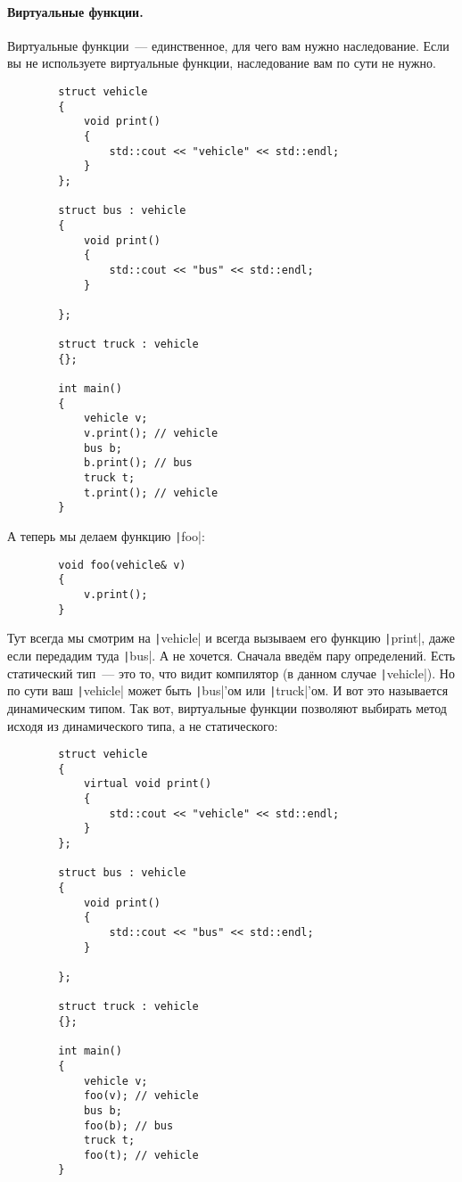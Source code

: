 \documentclass{article}
\begin{document}
    \paragraph{Виртуальные функции.}
    Виртуальные функции~--- единственное, для чего вам нужно наследование. Если вы не используете виртуальные функции, наследование вам по сути не нужно.
    \begin{verbatim}
        struct vehicle
        {
            void print()
            {
                std::cout << "vehicle" << std::endl;
            }
        };

        struct bus : vehicle
        {
            void print()
            {
                std::cout << "bus" << std::endl;
            }
            
        };

        struct truck : vehicle
        {};

        int main()
        {
            vehicle v;
            v.print(); // vehicle
            bus b;
            b.print(); // bus
            truck t;
            t.print(); // vehicle
        }
    \end{verbatim}
    А теперь мы делаем функцию \texttt|foo|:
    \begin{verbatim}
        void foo(vehicle& v)
        {
            v.print();
        }
    \end{verbatim}
    Тут всегда мы смотрим на \texttt|vehicle| и всегда вызываем его функцию \texttt|print|, даже если передадим туда \texttt|bus|. А не хочется. Сначала введём пару определений. Есть статический тип~--- это то, что видит компилятор (в данном случае \texttt|vehicle|). Но по сути ваш \texttt|vehicle| может быть \texttt|bus|'ом или \texttt|truck|'ом. И вот это называется динамическим типом. Так вот, виртуальные функции позволяют выбирать метод исходя из динамического типа, а не статического:
    \begin{verbatim}
        struct vehicle
        {
            virtual void print()
            {
                std::cout << "vehicle" << std::endl;
            }
        };

        struct bus : vehicle
        {
            void print()
            {
                std::cout << "bus" << std::endl;
            }
            
        };

        struct truck : vehicle
        {};

        int main()
        {
            vehicle v;
            foo(v); // vehicle
            bus b;
            foo(b); // bus
            truck t;
            foo(t); // vehicle
        }
    \end{verbatim}
\end{document}

